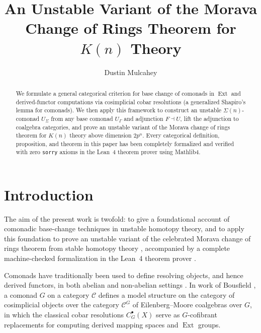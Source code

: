 \documentclass[11pt,reqno]{amsart}
\title[An Unstable Morava Change of Rings Theorem for $K(n)$ Theory]{An Unstable Variant of the Morava Change of Rings Theorem for $K(n)$ Theory\\ \vspace{0.3em}{\small With a Complete Formalization in Lean 4}}
\author{Dustin Mulcahey}
\theoremstyle{plain}
\theoremstyle{definition}
\newcommand{\Ext}{\operatorname{Ext}}
\begin{document}
\begin{abstract}
We formulate a general categorical criterion for base change of comonads in $\Ext$ and derived-functor computations via cosimplicial cobar resolutions (a generalized Shapiro's lemma for comonads). We then apply this framework to construct an unstable $\Sigma(n)$-comonad $U_{\Sigma}$ from any base comonad $U_{\Gamma}$ and adjunction $F \dashv U$, lift the adjunction to coalgebra categories, and prove an unstable variant of the Morava change of rings theorem for $K(n)$ theory above dimension $2p^n$. Every categorical definition, proposition, and theorem in this paper has been completely formalized and verified with zero \texttt{sorry} axioms in the Lean~4 theorem prover using Mathlib4.
\end{abstract}

\maketitle
\tableofcontents

\section{Introduction}

The aim of the present work is twofold: to give a foundational account of comonadic base-change techniques in unstable homotopy theory, and to apply this foundation to prove an unstable variant of the celebrated Morava change of rings theorem from stable homotopy theory \cite{mr,greenbook}, accompanied by a complete machine-checked formalization in the Lean~4 theorem prover \cite{lean4,mathlib}.

Comonads have traditionally been used to define resolving objects, and hence derived functors, in both abelian and non-abelian settings \cite{barrbeck}. In work of Bousfield \cite{bousfield}, a comonad $G$ on a category $\mathcal{C}$ defines a model structure on the category of cosimplicial objects over the category $\mathcal{C}^G$ of Eilenberg--Moore coalgebras over $G$, in which the classical cobar resolutions $C^{\bullet}_G(X)$ serve as $G$-cofibrant replacements for computing derived mapping spaces and $\Ext$ groups.
\end{document}
